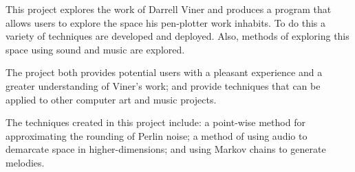 This project explores the work of Darrell Viner and produces a program that
allows users to explore the space his pen-plotter work inhabits. To do this a
variety of techniques are developed and deployed. Also, methods of exploring
this space using sound and music are explored. 

The project both provides potential users with a pleasant experience and a
greater understanding of Viner's work; and provide techniques that can be
applied to other computer art and music projects.

The techniques created in this project include: a point-wise method for
approximating the rounding of Perlin noise; a method of using audio to demarcate
space in higher-dimensions; and using Markov chains to generate melodies.
